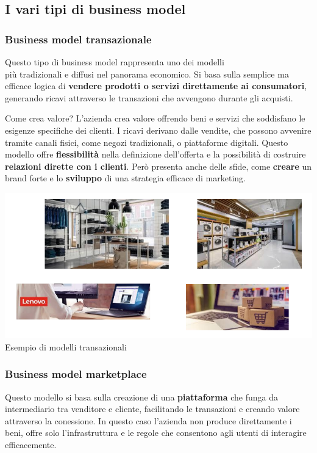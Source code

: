 \documentclass[14pt]{extarticle}
\begin{document}
\subsection{I vari tipi di business model}

\subsubsection{Business model transazionale}

Questo tipo di business model rappresenta uno dei modelli \\più tradizionali e
diffusi nel panorama economico. Si basa sulla semplice ma efficace logica di
\textbf{vendere prodotti o servizi direttamente ai consumatori}, generando
ricavi attraverso le transazioni che avvengono durante gli acquisti.

\textcolor{red!50}{Come crea valore?}
L'azienda crea valore offrendo beni e servizi che soddisfano le esigenze
specifiche dei clienti. I ricavi derivano dalle vendite, che possono avvenire
tramite canali fisici, come negozi tradizionali, o piattaforme digitali. Questo
modello offre \textbf{flessibilità} nella definizione dell'offerta e la
possibilità di costruire \textbf{relazioni dirette con i clienti}. Però presenta
anche delle sfide, come \textbf{creare} un brand forte e lo \textbf{sviluppo} di
una strategia efficace di marketing.

\begin{center}
    \includegraphics[scale=0.60]{images/transazionale.png}
    Esempio di modelli transazionali
\end{center}

\subsubsection{Business model marketplace}

Questo modello si basa sulla creazione di una \textbf{piattaforma} che funga da
intermediario tra venditore e cliente, facilitando le transazioni e creando
valore attraverso la conessione. In questo caso l'azienda non produce
direttamente i beni, offre solo l'infrastruttura e le regole che consentono agli
utenti di interagire efficacemente.
\end{document}
